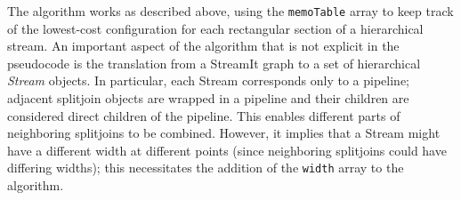 The algorithm works as described above, using the {\tt memoTable}
array to keep track of the lowest-cost configuration for each
rectangular section of a hierarchical stream.  An important aspect of
the algorithm that is not explicit in the pseudocode is the
translation from a StreamIt graph to a set of hierarchical {\it
Stream} objects.  In particular, each Stream corresponds only to a
pipeline; adjacent splitjoin objects are wrapped in a pipeline and
their children are considered direct children of the pipeline. This
enables different parts of neighboring splitjoins to be combined.
However, it implies that a Stream might have a different width at
different points (since neighboring splitjoins could have differing
widths); this necessitates the addition of the {\tt width} array to
the algorithm.

